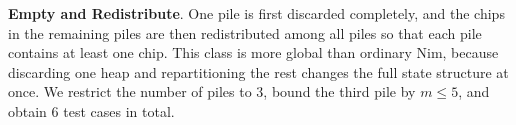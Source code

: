 \documentclass[review]{elsarticle}
\newcommand{\set}[1]{\{ #1 \}}
\newcommand{\tuple}[1]{\langle {#1} \rangle}
\newcommand{\true}{\top}
\newcommand{\statevar}{\mathcal{X}}
\newcommand{\act}{\mathcal{A}}
\newcommand{\constraint}{\mathcal{C}}
\newcommand{\estate}{\mathcal{E}}
\newcommand{\pre}{\mathtt{pre}}
\newcommand{\eff}{\mathtt{eff}}
\begin{document}
\textbf{Empty and Redistribute}. One pile is first discarded completely, and the chips in the remaining piles are then redistributed among all piles so that each pile contains at least one chip.
This class is more global than ordinary Nim, because discarding one heap and repartitioning the rest changes the full state structure at once.
We restrict the number of piles to $3$, bound the third pile by $m \le 5$, and obtain $6$ test cases in total.
\end{document}
